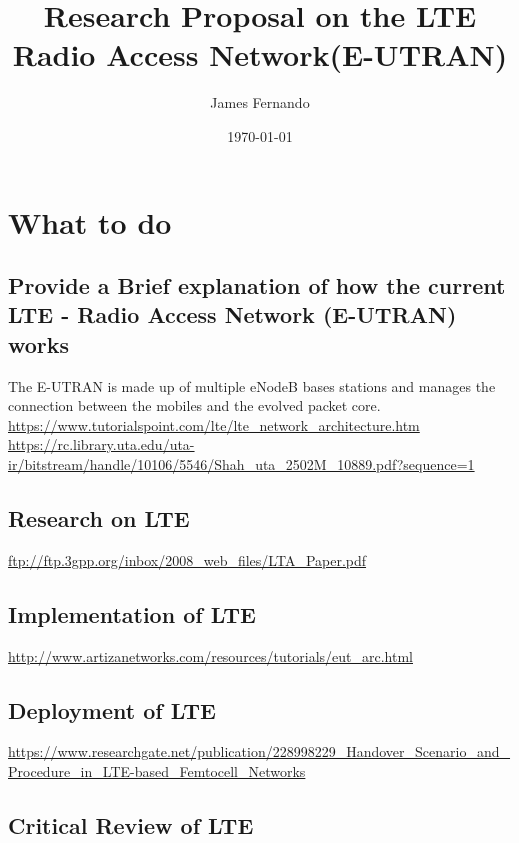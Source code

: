 \documentclass[a4paper,12pt]{scrartcl}
\title{Research Proposal on the LTE Radio Access Network(E-UTRAN)}
\author{James Fernando}
\date{\today}
\begin{document}
	
	\begin{titlepage}
		\maketitle
	\end{titlepage}
	
	\tableofcontents
	\newpage	
	\section{What to do}
	{
		\subsection{Provide a Brief explanation of how the current LTE - Radio Access Network (E-UTRAN) works}
		{
			The E-UTRAN is made up of multiple eNodeB bases stations and manages the connection between the mobiles and the evolved packet core. 
			\url{https://www.tutorialspoint.com/lte/lte_network_architecture.htm}
			\url{https://rc.library.uta.edu/uta-ir/bitstream/handle/10106/5546/Shah_uta_2502M_10889.pdf?sequence=1}
		}
		\subsection{Research on LTE}
		{
			\url{ftp://ftp.3gpp.org/inbox/2008_web_files/LTA_Paper.pdf}
		}
		\subsection{Implementation of LTE}
		{
			\url{http://www.artizanetworks.com/resources/tutorials/eut_arc.html}
		}
		\subsection{Deployment of LTE}
		{
			\url{https://www.researchgate.net/publication/228998229_Handover_Scenario_and_Procedure_in_LTE-based_Femtocell_Networks}
		}
		\subsection{Critical Review of LTE}
		{
		
		}
	}
	
	\newpage
	
	\printbibliography[heading=bibintoc,title=References]
\end{document}
